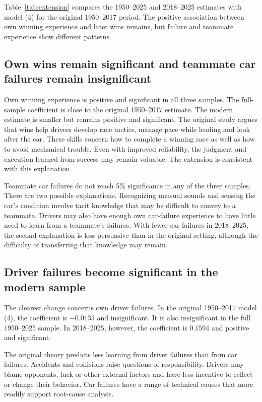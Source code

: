 \documentclass[11pt,letterpaper]{article}
\begin{document}
Table~\ref{tab:extension} compares the 1950--2025 and 2018--2025 estimates with model (4) for the original 1950--2017 period. The positive association between own winning experience and later wins remains, but failure and teammate experience show different patterns.

\subsection*{Own wins remain significant and teammate car failures remain insignificant}

Own winning experience is positive and significant in all three samples. The full-sample coefficient is close to the original 1950--2017 estimate. The modern estimate is smaller but remains positive and significant. The original study argues that wins help drivers develop race tactics, manage pace while leading and look after the car. These skills concern how to complete a winning race as well as how to avoid mechanical trouble. Even with improved reliability, the judgment and execution learned from success may remain valuable. The extension is consistent with this explanation.

Teammate car failures do not reach 5\% significance in any of the three samples. There are two possible explanations. Recognizing unusual sounds and sensing the car's condition involve tacit knowledge that may be difficult to convey to a teammate. Drivers may also have enough own car-failure experience to have little need to learn from a teammate's failures. With fewer car failures in 2018--2025, the second explanation is less persuasive than in the original setting, although the difficulty of transferring that knowledge may remain.

\subsection*{Driver failures become significant in the modern sample}

The clearest change concerns own driver failures. In the original 1950--2017 model (4), the coefficient is $-0.0135$ and insignificant. It is also insignificant in the full 1950--2025 sample. In 2018--2025, however, the coefficient is 0.1594 and positive and significant.

The original theory predicts less learning from driver failures than from car failures. Accidents and collisions raise questions of responsibility. Drivers may blame opponents, luck or other external factors and have less incentive to reflect or change their behavior. Car failures have a range of technical causes that more readily support root-cause analysis.
\end{document}
